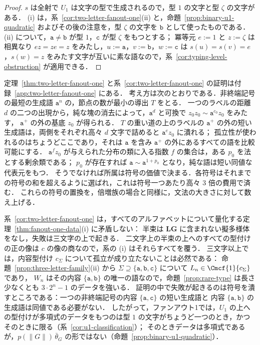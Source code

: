 \begin{proof}
$s$ は全射で $U_1$ は文字の型で生成されるので，型 $1$ の文字と型 $\zeta$ の文字がある．
(i) は，系~\ref{cor:two-letter-fanout-one}(ii) と，命題~\ref{prop:binary-u1-quadratic} およびその後の注意を，型 $\zeta$ の文字を $\mathtt b$ として使ったものである．
(ii) について，$\mathtt a\ne\mathtt b$ が型 $1$，$\mathtt c$ が型 $\zeta$ をもつとする；
冪等元 $e:=1$ と $z:=\zeta$ は相異なり $ez=ze=z$ をみたし，$u:=\mathtt a$，$v:=\mathtt b$，$w:=\mathtt c$ は
$s(u)=s(v)=e$，$s(w)=z$ をみたす文字が互いに素な語なので，系~\ref{cor:typing-level-obstruction} が適用できる．
\end{proof}

定理~\ref{thm:two-letter-fanout-one} と系~\ref{cor:two-letter-fanout-one} の証明は付録~\ref{app:two-letter-fanout-one} にある．
考え方は次のとおりである．非終端記号の最短の生成語 $\mathtt a^n$ の，節点の数が最小の導出 $T$ をとる．
一つのラベルの距離 $d$ の二つの出現から，純な塊の消去によって，$\mathtt a^d$ と可換で $z_0z_0\sim\mathtt a^{c_0}z_0$ をみたす，
$\mathtt a^+$ の外の基底 $z_0$ が得られる．
$T$ の重い道の上のラベルの $\mathtt a^+$ の外の短い生成語は，両側をそれぞれ高々 $d$ 文字で詰めると $\mathtt a^ez_0$ に潰れる；
孤立性が使われるのはちょうどここであり，それは $\mathtt a$ を含み $\mathtt a^+$ の外にあるすべての語を比較可能にする．
$\mathtt a^fz_0$ が与えられた分布の類に入る指数 $f$ の集合は，ある $p_0$ を法とする剰余類である；
$p_0$ が存在すれば $\mathtt a\sim\mathtt a^{1+p_0}$ となり，純な語は短い同値な代表元をもつ．
そうでなければ所属は符号の価値で決まる．各符号はそれまでの符号の和を超えるように選ばれ，これは符号一つあたり高々 $3$ 倍の費用で済む．
これらの符号の置換を，倍増族の場合と同様に，文法の大きさに対して数え上げる．

系~\ref{cor:two-letter-fanout-one} は，すべてのアルファベットについて量化する定理~\ref{thm:fanout-one-data}(i) に矛盾しない：
半束は $\mathbf{LG}$ に含まれない擬多様体をなし，失敗は三文字の上で起きる．
二文字上の半束の上へのすべての型付けの正の像は $c$ の像の商なので，系の (i) はそれらすべてを覆う．
三文字以上では，内容型付け $c_\Sigma$ について孤立が成り立たないことは必然である：
命題~\ref{prop:three-letter-family}(ii) から $\Sigma\supseteq\{\mathtt a,\mathtt b,\mathtt c\}$ について $L_n\in\Cmcf{1}{c_\Sigma}$ であり，
$W_n$ はその内容 $\{\mathtt a,\mathtt b\}$ の唯一の語なので，命題~\ref{prop:rare-type} は長さ少なくとも $3\cdot2^n-1$ のデータを強いる．
証明の中で失敗が起きるのは符号を潰すところである：一つの非終端記号の内容 $\{\mathtt a,\mathtt c\}$ の短い生成語と
内容 $\{\mathtt a,\mathtt b\}$ の生成語は同値である必要がない．
したがって，ファンアウト1では，$U_1$ の上への型付けが多項式のデータをもつのは型 $1$ の文字がちょうど一つのとき，かつそのときに限る（系~\ref{cor:u1-classification}）；
そのときデータは多項式であるが，$p(\|G\|)\,\bar\theta_G$ の形ではない（命題~\ref{prop:binary-u1-quadratic}）．

